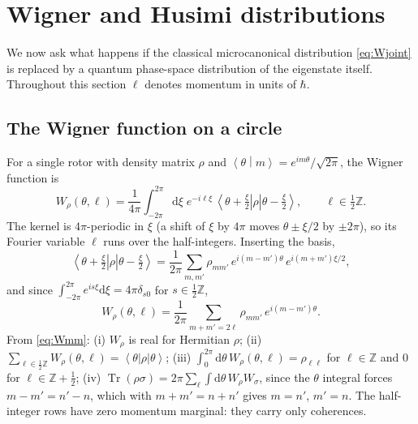 \documentclass[preprint,12pt]{elsarticle}
\newcommand{\Tr}{\operatorname{Tr}}
\newcommand{\ket}[1]{\left|#1\right\rangle}
\newcommand{\bra}[1]{\left\langle#1\right|}
\newcommand{\braket}[2]{\left\langle#1\middle|#2\right\rangle}
\newcommand{\dd}{\mathrm{d}}
\begin{document}
\section{Wigner and Husimi distributions}
\label{sec:wigner}

We now ask what happens if the classical microcanonical distribution
\eqref{eq:Wjoint} is replaced by a quantum phase-space distribution of the
eigenstate itself. Throughout this section $\ell$ denotes momentum in units of
$\hbar$.

\subsection{The Wigner function on a circle}

For a single rotor with density matrix $\rho$ and $\braket{\theta}{m}=
e^{im\theta}/\sqrt{2\pi}$, the Wigner function
is~\cite{Mukunda,Bizarro,Rigas}
\begin{equation}
W_{\rho}(\theta,\ell)=\frac{1}{4\pi}\int_{-2\pi}^{2\pi}\dd\xi\;e^{-i\ell\xi}\,
\bra{\theta+\tfrac{\xi}{2}}\rho\ket{\theta-\tfrac{\xi}{2}},\qquad
\ell\in\tfrac12\mathbb{Z}.
\label{eq:Wdef}
\end{equation}
The kernel is $4\pi$-periodic in $\xi$ (a shift of $\xi$ by $4\pi$ moves
$\theta\pm\xi/2$ by $\pm2\pi$), so its Fourier variable $\ell$ runs over the
half-integers. Inserting the basis,
\begin{equation}
\bra{\theta+\tfrac{\xi}{2}}\rho\ket{\theta-\tfrac{\xi}{2}}=\frac{1}{2\pi}
\sum_{m,m'}\rho_{mm'}\,e^{i(m-m')\theta}\,e^{i(m+m')\xi/2},
\end{equation}
and since $\int_{-2\pi}^{2\pi}e^{is\xi}\dd\xi=4\pi\delta_{s0}$ for
$s\in\tfrac12\mathbb{Z}$,
\begin{equation}
W_{\rho}(\theta,\ell)=\frac{1}{2\pi}\sum_{m+m'=2\ell}\rho_{mm'}\,e^{i(m-m')\theta}.
\label{eq:Wmm}
\end{equation}
From \eqref{eq:Wmm}: (i) $W_{\rho}$ is real for Hermitian $\rho$;
(ii) $\sum_{\ell\in\frac12\mathbb{Z}}W_{\rho}(\theta,\ell)=\bra\theta\rho\ket\theta$;
(iii) $\int_{0}^{2\pi}\dd\theta\,W_{\rho}(\theta,\ell)=\rho_{\ell\ell}$ for
$\ell\in\mathbb{Z}$ and $0$ for $\ell\in\mathbb{Z}+\tfrac12$;
(iv) $\Tr(\rho\sigma)=2\pi\sum_{\ell}\int\dd\theta\,W_{\rho}W_{\sigma}$, since
the $\theta$ integral forces $m-m'=n'-n$, which with $m+m'=n+n'$ gives $m=n'$,
$m'=n$. The half-integer rows have zero momentum marginal: they carry only
coherences.
\end{document}
